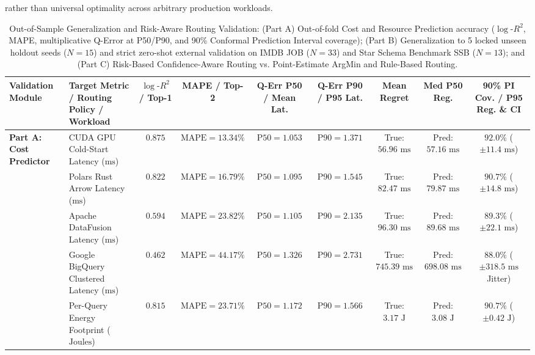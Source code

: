 \documentclass[10pt,a4paper]{article}
\newenvironment{fitasttable}{%
  \begin{lrbox}{\asttblbox}%
}{%
  \end{lrbox}%
  \sbox{\asttblboxB}{%
    \ifdim\wd\asttblbox>0.96\textwidth
      \resizebox{0.96\textwidth}{!}{\usebox{\asttblbox}}%
    \else
      \usebox{\asttblbox}%
    \fi
  }%
  \ifdim\ht\asttblboxB>0.72\textheight
    \resizebox{!}{0.72\textheight}{\usebox{\asttblboxB}}%
  \else
    \usebox{\asttblboxB}%
  \fi
}
\begin{document}
\begin{enumerate}[leftmargin=1.5em,itemsep=2pt]
rather than universal optimality across arbitrary production workloads.

\begin{table}[!htbp]
\centering
\caption{Out-of-Sample Generalization and Risk-Aware Routing Validation: (Part A) Out-of-fold Cost and Resource Prediction accuracy ($\log\text{-}R^2$, MAPE, multiplicative Q-Error at P50/P90, and 90\% Conformal Prediction Interval coverage); (Part B) Generalization to 5 locked unseen holdout seeds ($N=15$) and strict zero-shot external validation on IMDB JOB ($N=33$) and Star Schema Benchmark SSB ($N=13$); and (Part C) Risk-Based Confidence-Aware Routing vs. Point-Estimate ArgMin and Rule-Based Routing.}\label{tab:jbd_unseen_t11}
\label{tab:priority3_validation}
\scriptsize
\setlength{\tabcolsep}{3.2pt}
\renewcommand{\arraystretch}{1.10}
\begin{fitasttable}
\begin{tabular}{@{}llccccccc@{}}
\toprule
\textbf{Validation Module} & \textbf{Target Metric / Routing Policy / Workload} & \textbf{$\log\text{-}R^2$ / Top-1} & \textbf{MAPE / Top-2} & \textbf{Q-Err P50 / Mean Lat.} & \textbf{Q-Err P90 / P95 Lat.} & \textbf{Mean Regret} & \textbf{Med P50 Reg.} & \textbf{90\% PI Cov. / P95 Reg. \& CI} \\
\midrule
\multirow{6}{*}{\textbf{Part A: Cost Predictor}}
 & CUDA GPU Cold-Start Latency ($\text{ms}$) & $0.875$ & $\text{MAPE}=13.34\%$ & $\text{P50}=1.053$ & $\text{P90}=1.371$ & True: $56.96\text{ ms}$ & Pred: $57.16\text{ ms}$ & $92.0\%$ ($\pm 11.4\text{ ms}$) \\
 & Polars Rust Arrow Latency ($\text{ms}$) & $0.822$ & $\text{MAPE}=16.79\%$ & $\text{P50}=1.095$ & $\text{P90}=1.545$ & True: $82.47\text{ ms}$ & Pred: $79.87\text{ ms}$ & $90.7\%$ ($\pm 14.8\text{ ms}$) \\
 & Apache DataFusion Latency ($\text{ms}$) & $0.594$ & $\text{MAPE}=23.82\%$ & $\text{P50}=1.105$ & $\text{P90}=2.135$ & True: $96.30\text{ ms}$ & Pred: $89.68\text{ ms}$ & $89.3\%$ ($\pm 22.1\text{ ms}$) \\
 & Google BigQuery Clustered Latency ($\text{ms}$) & $0.462$ & $\text{MAPE}=44.17\%$ & $\text{P50}=1.326$ & $\text{P90}=2.731$ & True: $745.39\text{ ms}$ & Pred: $698.08\text{ ms}$ & $88.0\%$ ($\pm 318.5\text{ ms}$ Jitter) \\
 & Per-Query Energy Footprint ($\text{Joules}$) & $0.815$ & $\text{MAPE}=23.71\%$ & $\text{P50}=1.172$ & $\text{P90}=1.566$ & True: $3.17\text{ J}$ & Pred: $3.08\text{ J}$ & $90.7\%$ ($\pm 0.42\text{ J}$) \\

\end{tabular}
\end{fitasttable}
\end{table}
\end{enumerate}
\end{document}
